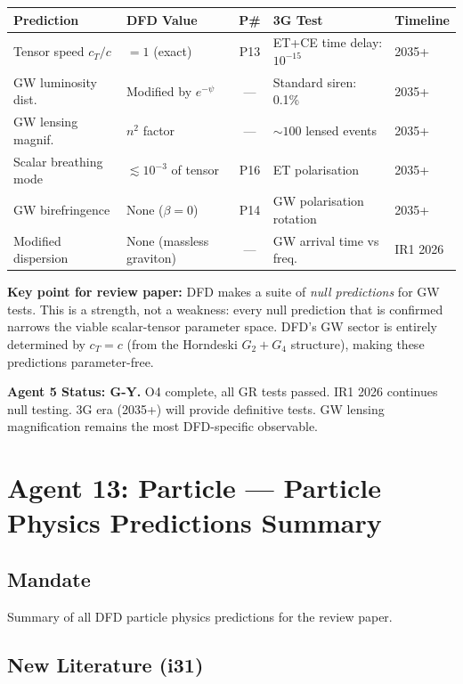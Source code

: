 \documentclass[11pt,a4paper]{article}
\newcommand{\GY}{\textcolor{dfdgy}{\textbf{G-Y}}}
\begin{document}
\begin{center}
\begin{longtable}{p{3cm}p{3cm}cp{3.5cm}l}
\toprule
\textbf{Prediction} & \textbf{DFD Value} & \textbf{P\#} & \textbf{3G Test} & \textbf{Timeline} \\
\midrule
\endfirsthead
Tensor speed $c_T/c$ & $= 1$ (exact) & P13 & ET+CE time delay: $10^{-15}$ & 2035+ \\
GW luminosity dist. & Modified by $e^{-\psi}$ & --- & Standard siren: 0.1\% & 2035+ \\
GW lensing magnif. & $n^2$ factor & --- & $\sim 100$ lensed events & 2035+ \\
Scalar breathing mode & $\lesssim 10^{-3}$ of tensor & P16 & ET polarisation & 2035+ \\
GW birefringence & None ($\beta = 0$) & P14 & GW polarisation rotation & 2035+ \\
Modified dispersion & None (massless graviton) & --- & GW arrival time vs freq. & IR1 2026 \\
\bottomrule
\end{longtable}
\end{center}

\textbf{Key point for review paper:} DFD makes a suite of \emph{null predictions} for GW tests. This is a strength, not a weakness: every null prediction that is confirmed narrows the viable scalar-tensor parameter space. DFD's GW sector is entirely determined by $c_T = c$ (from the Horndeski $G_2 + G_4$ structure), making these predictions parameter-free.

\textbf{Agent 5 Status: \GY.} O4 complete, all GR tests passed. IR1 2026 continues null testing. 3G era (2035+) will provide definitive tests. GW lensing magnification remains the most DFD-specific observable.

\section{Agent 13: Particle --- Particle Physics Predictions Summary}

\subsection{Mandate}
Summary of all DFD particle physics predictions for the review paper.

\subsection{New Literature (i31)}
\end{document}
